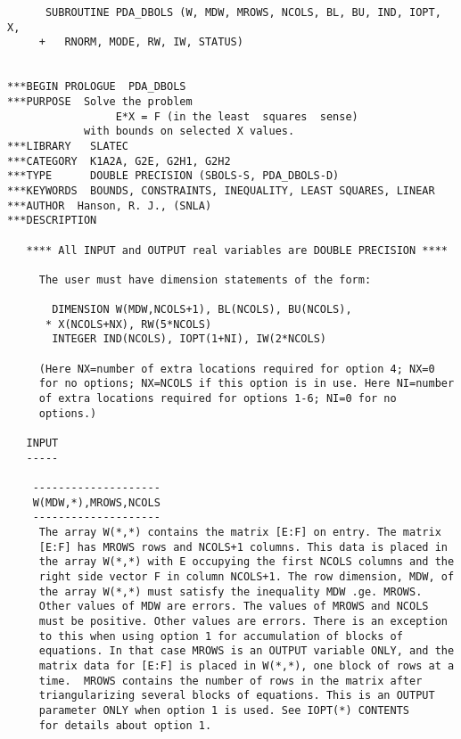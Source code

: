  


\begin{verbatim}
      SUBROUTINE PDA_DBOLS (W, MDW, MROWS, NCOLS, BL, BU, IND, IOPT, X,
     +   RNORM, MODE, RW, IW, STATUS)


***BEGIN PROLOGUE  PDA_DBOLS
***PURPOSE  Solve the problem
                 E*X = F (in the least  squares  sense)
            with bounds on selected X values.
***LIBRARY   SLATEC
***CATEGORY  K1A2A, G2E, G2H1, G2H2
***TYPE      DOUBLE PRECISION (SBOLS-S, PDA_DBOLS-D)
***KEYWORDS  BOUNDS, CONSTRAINTS, INEQUALITY, LEAST SQUARES, LINEAR
***AUTHOR  Hanson, R. J., (SNLA)
***DESCRIPTION

   **** All INPUT and OUTPUT real variables are DOUBLE PRECISION ****

     The user must have dimension statements of the form:

       DIMENSION W(MDW,NCOLS+1), BL(NCOLS), BU(NCOLS),
      * X(NCOLS+NX), RW(5*NCOLS)
       INTEGER IND(NCOLS), IOPT(1+NI), IW(2*NCOLS)

     (Here NX=number of extra locations required for option 4; NX=0
     for no options; NX=NCOLS if this option is in use. Here NI=number
     of extra locations required for options 1-6; NI=0 for no
     options.)

   INPUT
   -----

    --------------------
    W(MDW,*),MROWS,NCOLS
    --------------------
     The array W(*,*) contains the matrix [E:F] on entry. The matrix
     [E:F] has MROWS rows and NCOLS+1 columns. This data is placed in
     the array W(*,*) with E occupying the first NCOLS columns and the
     right side vector F in column NCOLS+1. The row dimension, MDW, of
     the array W(*,*) must satisfy the inequality MDW .ge. MROWS.
     Other values of MDW are errors. The values of MROWS and NCOLS
     must be positive. Other values are errors. There is an exception
     to this when using option 1 for accumulation of blocks of
     equations. In that case MROWS is an OUTPUT variable ONLY, and the
     matrix data for [E:F] is placed in W(*,*), one block of rows at a
     time.  MROWS contains the number of rows in the matrix after
     triangularizing several blocks of equations. This is an OUTPUT
     parameter ONLY when option 1 is used. See IOPT(*) CONTENTS
     for details about option 1.


\end{verbatim}
